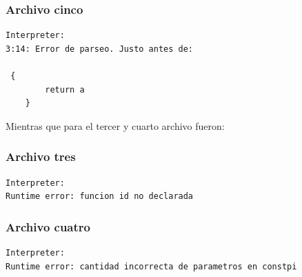 \subsubsection{Archivo cinco}
\begin{verbatim}
Interpreter: 
3:14: Error de parseo. Justo antes de:

 {
        return a
    }
\end{verbatim}

Mientras que para el tercer y cuarto archivo fueron:

\subsubsection{Archivo tres}
\begin{verbatim}
Interpreter: 
Runtime error: funcion id no declarada
\end{verbatim}

\subsubsection{Archivo cuatro}
\begin{verbatim}
Interpreter: 
Runtime error: cantidad incorrecta de parametros en constpi
\end{verbatim}
